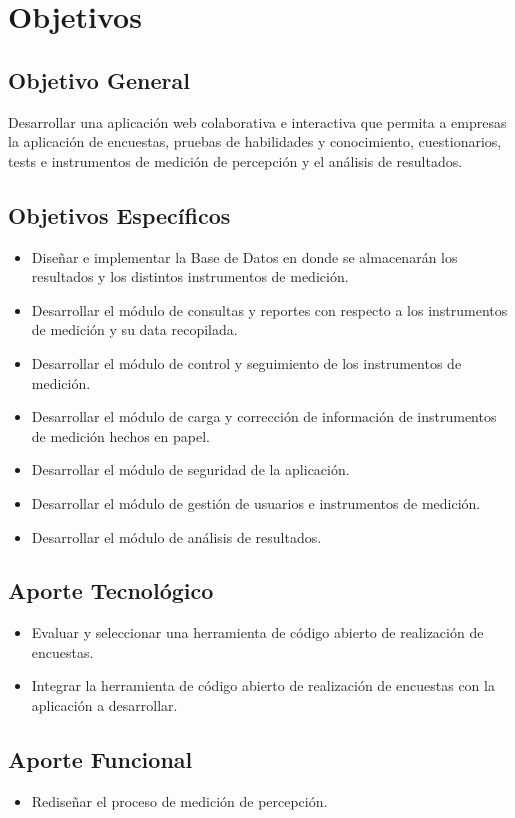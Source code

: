 \chapter{Objetivos}
\section{Objetivo General}
Desarrollar una aplicación web colaborativa e interactiva que permita a empresas la aplicación de encuestas, pruebas de habilidades y conocimiento, cuestionarios, tests e instrumentos de medición de percepción y el análisis de resultados.

\section{Objetivos Específicos}
\begin{itemize}
\item Diseñar e implementar la Base de Datos en donde se almacenarán los resultados y los distintos instrumentos de medición.
\item Desarrollar el módulo de consultas y reportes con respecto a los instrumentos de medición y su data recopilada.
\item Desarrollar el módulo de control y seguimiento de los instrumentos de medición.
\item Desarrollar el módulo de carga y corrección de información de instrumentos de medición hechos en papel.
\item Desarrollar el módulo de seguridad de la aplicación.
\item Desarrollar el módulo de gestión de usuarios e instrumentos de medición.
\item Desarrollar el módulo de análisis de resultados.
\end{itemize}

\section{Aporte Tecnológico}
\begin{itemize}
\item Evaluar y seleccionar una herramienta de código abierto de realización de encuestas.
\item Integrar la herramienta de código abierto de realización de encuestas con la aplicación a desarrollar.
\end{itemize}

\section{Aporte Funcional}
\begin{itemize}
\item Rediseñar el proceso de medición de percepción.
\end{itemize}